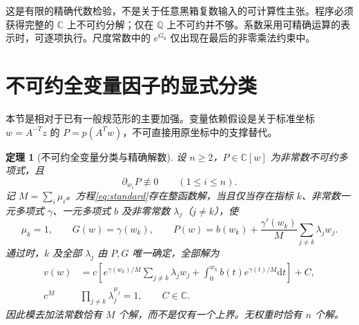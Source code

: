 \documentclass[UTF8,11pt,a4paper,fontset=fandol]{ctexart}
\newtheorem{theorem}{定理}[section]
\theoremstyle{definition}\newtheorem{definition}[theorem]{定义}
\theoremstyle{remark}\newtheorem{remark}[theorem]{注}
\newcommand{\C}{\mathbb C}\newcommand{\N}{\mathbb N}
\newcommand{\dd}{\mathrm d}\newcommand{\OO}{\mathcal O}
\begin{document}
这是有限的精确代数检验，不是关于任意黑箱复数输入的可计算性主张。程序必须获得完整的 $\C$ 上不可约分解；仅在 $\mathbb Q$ 上不可约并不够。系数采用可精确运算的表示时，可逐项执行。尺度常数中的 $e^{G_0}$ 仅出现在最后的非零乘法约束中。

\section{不可约全变量因子的显式分类}\label{sec:irreducible}
本节是相对于已有一般规范形的主要加强。变量依赖假设是关于标准坐标 $w=A^{-T}z$ 的 $P=p(A^Tw)$，不可直接用原坐标中的支撑替代。

\begin{theorem}[不可约全变量分类与精确解数]\label{thm:irreducible}
设 $n\ge2$，$P\in\C[w]$ 为非常数不可约多项式，且
\begin{equation}\label{eq:fullsupport}
\partial_{w_i}P\not\equiv0\qquad(1\le i\le n).
\end{equation}
记 $M=\sum_i\mu_i$。方程\eqref{eq:standard}存在整函数解，当且仅当存在指标 $k$、非常数一元多项式 $\gamma$、一元多项式 $b$ 及非零常数 $\lambda_j$（$j\ne k$），使
\begin{equation}\label{eq:irredcriterion}
\mu_k=1,\qquad G(w)=\gamma(w_k),\qquad
P(w)=b(w_k)+\frac{\gamma'(w_k)}{M}\sum_{j\ne k}\lambda_jw_j.
\end{equation}
通过时，$k$ 及全部 $\lambda_j$ 由 $P,G$ 唯一确定，全部解为
\begin{equation}\label{eq:irredsolution}
\begin{split}
v(w)&=c\left[e^{\gamma(w_k)/M}\sum_{j\ne k}\lambda_jw_j
+\int_0^{w_k}b(t)e^{\gamma(t)/M}\dd t\right]+C,\\
c^M&\prod_{j\ne k}\lambda_j^{\mu_j}=1,\qquad C\in\C.
\end{split}
\end{equation}
因此模去加法常数恰有 $M$ 个解，而不是仅有一个上界。无权重时恰有 $n$ 个解。
\end{theorem}
\end{document}
